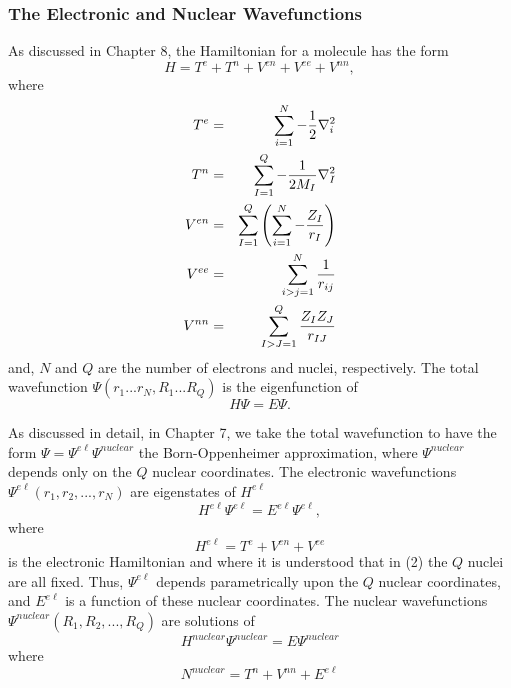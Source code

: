 \subsubsection{The Electronic and Nuclear Wavefunctions}

As discussed in Chapter 8, the Hamiltonian for a molecule has the form
\begin{equation}
H = T^e + T^n + V^{en} + V^{ee} + V^{nn},
\label{chap16-eqno1a}
\end{equation}
where
\begin{eqnarray}
T^e &=& \sum_{i=1}^N - {1 \over 2} \nabla^2_i\cr
T^n &=& \sum_{I=1}^Q - {1 \over 2M_I} \nabla^2_I\cr
V^{en} &=& \sum^Q_{I=1} \left( \sum^N_{i=1} - {Z_I \over r_I} 
\right)\cr
V^{ee} &=& \sum^N_{i>j=1} {1 \over r_{ij}}\cr
V^{nn} &=& \sum^Q_{I>J=1} {Z_IZ_J \over r_{IJ}}
\end{eqnarray}
and, $N$ and $Q$ are the number of electrons and nuclei, 
respectively.  The total wavefunction $\Psi(r_1 ... r_N, R_1 ... 
R_Q)$ is the eigenfunction of
\begin{equation}
H \Psi = E \Psi.
\label{chap16-eqno1b}
\end{equation}

As discussed in detail, in Chapter 7, we take the total wavefunction 
to have the form $\Psi = \Psi^{e \ell} \Psi^{nuclear}$
the Born-Oppenheimer approximation, where $\Psi^{nuclear}$ depends 
only on the $Q$ nuclear coordinates.  The electronic wavefunctions 
$\Psi^{e \ell}(r_1, r_2, ..., r_N)$ are eigenstates of $H^{e \ell}$
\begin{equation}
H^{e \ell} \Psi^{e \ell} = E^{e \ell} \Psi^{e \ell},
\label{chap16-eqno2a}
\end{equation}
where
\begin{equation}
H^{e \ell}  = T^e + V^{en} + V^{ee}
\label{chap16-eqno2b}
\end{equation}
is the electronic Hamiltonian and where it is understood that in (2) 
the $Q$ nuclei are all fixed.  Thus, $\Psi^{e \ell}$ depends 
parametrically upon the $Q$ nuclear coordinates, and $E^{e \ell}$ is a 
function of these nuclear coordinates.  The nuclear wavefunctions
$\Psi^{nuclear}(R_1, R_2 , ..., R_Q)$ are solutions of
\begin{equation}
H^{nuclear} \Psi^{nuclear} = E \Psi^{nuclear}
\label{chap16-eqno3a}
\end{equation}
where
\begin{equation}
N^{nuclear} = T^n + V^{nn} + E^{e \ell}
\label{chap16-eqno3b}
\end{equation}

